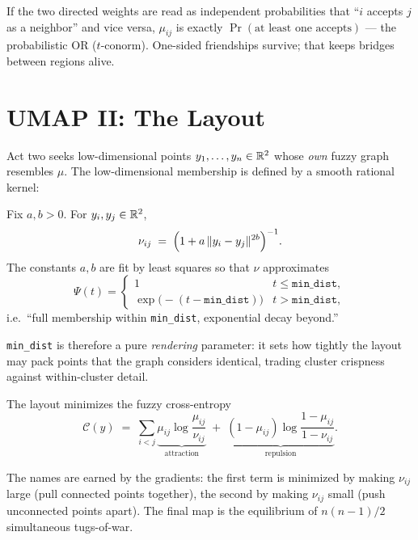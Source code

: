 \begin{remark}
If the two directed weights are read as independent probabilities that ``$i$
accepts $j$ as a neighbor'' and vice versa, $\mu_{ij}$ is exactly
$\Pr(\text{at least one accepts})$ --- the probabilistic OR
($t$-conorm). One-sided friendships survive; that keeps bridges between
regions alive.
\end{remark}

\section{UMAP II: The Layout}

Act two seeks low-dimensional points $y_1, \dots, y_n \in \mathbb{R}^2$ whose
\emph{own} fuzzy graph resembles $\mu$. The low-dimensional membership is
defined by a smooth rational kernel:

\begin{definition}\label{def:nukernel}
Fix $a, b > 0$. For $y_i, y_j \in \mathbb{R}^2$,
\[
\nu_{ij} \;=\; \Big(1 + a\,\lVert y_i - y_j\rVert^{2b}\Big)^{-1}.
\]
The constants $a, b$ are fit by least squares so that $\nu$ approximates
\[
\Psi(t) =
\begin{cases}
1 & t \le \texttt{min\_dist}, \\
\exp\!\big(-(t - \texttt{min\_dist})\big) & t > \texttt{min\_dist},
\end{cases}
\]
i.e.\ ``full membership within \texttt{min\_dist}, exponential decay
beyond.''
\end{definition}

\texttt{min\_dist} is therefore a pure \emph{rendering} parameter: it sets
how tightly the layout may pack points that the graph considers identical,
trading cluster crispness against within-cluster detail.

\begin{definition}[Objective]\label{def:umapce}
The layout minimizes the fuzzy cross-entropy
\[
\mathcal{C}(y) \;=\; \sum_{i < j}
\underbrace{\mu_{ij} \log \frac{\mu_{ij}}{\nu_{ij}}}_{\text{attraction}}
\;+\;
\underbrace{(1 - \mu_{ij}) \log \frac{1 - \mu_{ij}}{1 - \nu_{ij}}}_{\text{repulsion}} .
\]
\end{definition}

The names are earned by the gradients: the first term is minimized by making
$\nu_{ij}$ large (pull connected points together), the second by making
$\nu_{ij}$ small (push unconnected points apart). The final map is the
equilibrium of $n(n-1)/2$ simultaneous tugs-of-war.

